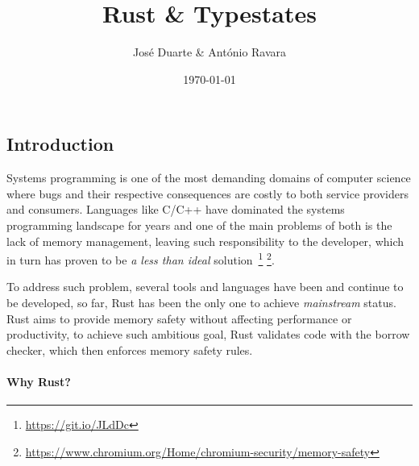 \documentclass{article}
\title{Rust \& Typestates}
\date{\today}
\author{José Duarte \& António Ravara}
\begin{document}
\maketitle

\subsection*{Introduction}

%

Systems programming is one of the most demanding domains of computer science where
bugs and their respective consequences are costly to both service providers and consumers.
Languages like C/C++ have dominated the systems programming landscape for years and
one of the main problems of both is the lack of memory management,
leaving such responsibility to the developer,
which in turn has proven to be \emph{a less than ideal}
solution~\footnote{\url{https://git.io/JLdDc}} \footnote{\url{https://www.chromium.org/Home/chromium-security/memory-safety}}.

To address such problem, several tools and languages have been and continue to be developed,
so far, Rust has been the only one to achieve \emph{mainstream} status.
Rust aims to provide memory safety without affecting performance or productivity,
to achieve such ambitious goal, Rust validates code with the borrow checker, which then enforces memory safety rules.

\paragraph{Why Rust?}
\end{document}
